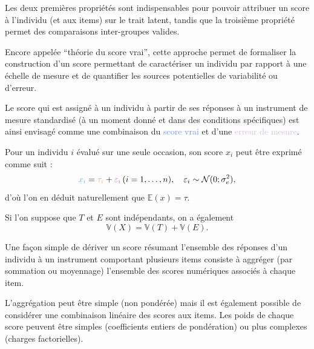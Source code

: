 Les deux premières propriétés sont indispensables pour pouvoir attribuer un
score à l'individu (et aux items) sur le trait latent, tandis que la troisième
propriété permet des comparaisons inter-groupes valides.


Encore appelée \enquote{théorie du score vrai}, cette approche permet de
formaliser la construction d'un score permettant de caractériser un individu par
rapport à une échelle de mesure et de quantifier les sources potentielles de
variabilité ou d'erreur.

Le \textcolor{Apricot}{score} qui est assigné à un individu à partir de ses
réponses à un instrument de mesure standardisé (à un moment donné et dans des
conditions spécifiques) est ainsi envisagé comme une combinaison du
\textcolor{CornflowerBlue}{score vrai} et d'une \textcolor{Thistle}{erreur de
  mesure}.




Pour un individu $i$ évalué sur une seule occasion, son score $x_i$ peut être
exprimé comme suit : 
\[
\textcolor{CornflowerBlue}{x_i} = \textcolor{Apricot}{\tau_i} +
\textcolor{Thistle}{\varepsilon_i}\, (i=1,\dots,n),\quad \varepsilon_i\sim\mathcal{N}(0;\sigma_e^2),
\]
d'où l'on en déduit naturellement que $\mathbb{E}(x)=\tau$.

Si l'on suppose que $T$ et $E$ sont indépendants, on a également
\[
\mathbb{V}(X) = \mathbb{V}(T)+\mathbb{V}(E).
\]


Une façon simple de dériver un score résumant l'ensemble des réponses d'un
individu à un instrument comportant plusieurs items consiste à aggréger (par
sommation ou moyennage) l'ensemble des scores numériques associés à chaque item.

L'aggrégation peut être simple (non pondérée) mais il est également possible de
considérer une combinaison linéaire des scores aux items. Les poids de chaque
score peuvent être simples (coefficients entiers de pondération) ou plus
complexes (charges factorielles).


